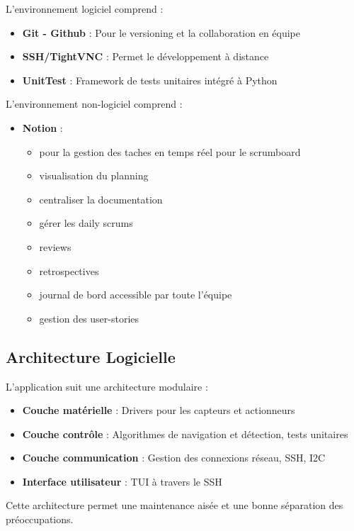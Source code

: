 \documentclass[a4paper, 12pt]{article}
\begin{document}
	L'environnement logiciel comprend :
	
	\begin{itemize}
		\item \textbf{Git - Github} : Pour le versioning et la collaboration en équipe
		\item \textbf{SSH/TightVNC} : Permet le développement à distance
		\item \textbf{UnitTest} : Framework de tests unitaires intégré à Python
			\end{itemize}
	L'environnement non-logiciel comprend :
		\begin{itemize}
		\item \textbf{Notion} : 
				\begin{itemize}
					\item pour la gestion des taches en temps réel pour le scrumboard
					\item visualisation du planning
					\item centraliser la documentation
					\item gérer les daily scrums
					\item reviews
					\item retrospectives
					\item journal de bord accessible par toute l'équipe
					\item  gestion des user-stories
				 
				\end{itemize} 
			\end{itemize}
	
	\subsection{Architecture Logicielle}
	
	L'application suit une architecture modulaire :
	
	\begin{itemize}
		\item \textbf{Couche matérielle} : Drivers pour les capteurs et actionneurs
		\item \textbf{Couche contrôle} : Algorithmes de navigation et détection, tests unitaires
		\item \textbf{Couche communication} : Gestion des connexions réseau, SSH, I2C
		\item \textbf{Interface utilisateur} : TUI à travers le SSH
	\end{itemize}
	Cette architecture permet une maintenance aisée et une bonne séparation des préoccupations.
	
\end{document}
